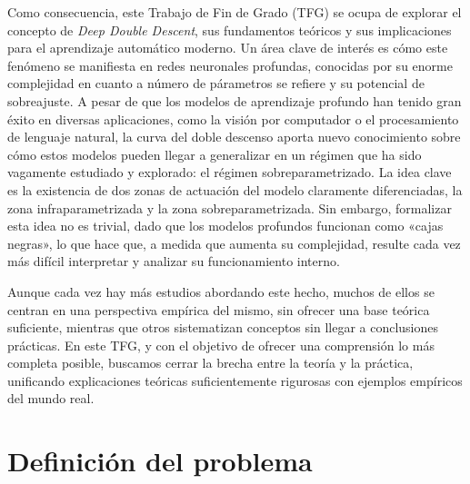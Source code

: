 Como consecuencia, este Trabajo de Fin de Grado (TFG) se ocupa de explorar el concepto de \emph{Deep Double Descent}, sus fundamentos teóricos y sus implicaciones para el aprendizaje automático moderno. Un área clave de interés es cómo este fenómeno se manifiesta en redes neuronales profundas, conocidas por su enorme complejidad en cuanto a número de párametros se refiere y su potencial de sobreajuste. A pesar de que los modelos de aprendizaje profundo han tenido gran éxito en diversas aplicaciones, como la visión por computador o el procesamiento de lenguaje natural, la curva del doble descenso aporta nuevo conocimiento sobre cómo estos modelos pueden llegar a generalizar en un régimen que ha sido vagamente estudiado y explorado: el régimen sobreparametrizado. La idea clave es la existencia de dos zonas de actuación del modelo claramente diferenciadas, la zona infraparametrizada y la zona sobreparametrizada. Sin embargo, formalizar esta idea no es trivial, dado que los modelos profundos funcionan como «cajas negras», lo que hace que, a medida que aumenta su complejidad, resulte cada vez más difícil interpretar y analizar su funcionamiento interno.

Aunque cada vez hay más estudios abordando este hecho, muchos de ellos se centran en una perspectiva empírica del mismo, sin ofrecer una base teórica suficiente, mientras que otros sistematizan conceptos sin llegar a conclusiones prácticas. En este TFG, y con el objetivo de ofrecer una comprensión lo más completa posible, buscamos cerrar la brecha entre la teoría y la práctica, unificando explicaciones teóricas suficientemente rigurosas con ejemplos empíricos del mundo real.


\section{Definición del problema}


